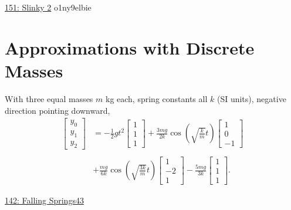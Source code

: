 \documentclass{ximera}
\begin{document}
\href{https://www.desmos.com/calculator/fahf3t461i}{151: Slinky 2}
o1ny9elbie


\section{Approximations with Discrete Masses}

With three equal masses $m$ kg each, spring constants all $k$ (SI units), negative direction pointing downward,
\begin{align*}
 \begin{bmatrix}
y_0\\
y_1 \\
y_2
\end{bmatrix} 
&=
-\frac{1}{2}gt^2 
 \begin{bmatrix}
1\\
1 \\
1
\end{bmatrix} 
+
\frac{3mg}{2k} \cos\left( \sqrt{\frac{k}{m}} t  \right)
 \begin{bmatrix}
1\\
0 \\
-1
\end{bmatrix}   \\ \\
& +  
\frac{mg}{6k} \cos\left( \sqrt{\frac{3k}{m}} t  \right)
 \begin{bmatrix}
1\\
-2 \\
1
\end{bmatrix}
-  
\frac{5mg}{3k}
 \begin{bmatrix}
1\\
1 \\
1
\end{bmatrix}.
\end{align*}

\begin{onlineOnly}
    \begin{center}
\end{center}
\end{onlineOnly}

\href{https://www.desmos.com/calculator/tnhnhzfnbu}{142: Falling Springs43}
\end{document}
